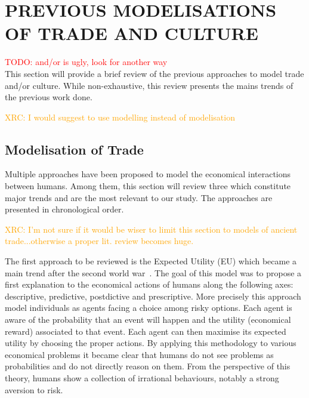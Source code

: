 \documentclass{wscpaperproc}
\newcommand{\memo}[2]{\textcolor{#1}{#2}}
\newcommand{\todo}[1]{\memo{red}{TODO: #1\\}}
\newcommand{\xrc}[1]{\memo{orange}{XRC: #1\\}}
\begin{document}
\section{PREVIOUS MODELISATIONS OF TRADE AND CULTURE}

\todo{and/or is ugly, look for another way}
This section will provide a brief review of the previous approaches to model trade and/or culture. While non-exhaustive, this review presents the mains trends of the previous work done.

\xrc{I would suggest to use modelling instead of modelisation}
\subsection{Modelisation of Trade}

Multiple approaches have been proposed to model the economical interactions between humans. Among them, this section will review three which constitute major trends and are the most relevant to our study. The approaches are presented in chronological order.

\xrc{I'm not sure if it would be wiser to limit this section to models of ancient trade...otherwise a proper lit. review becomes huge.}

The first approach to be reviewed is the Expected Utility (EU) which became a main trend after the second world war~\cite{schoemaker_expected_1982}. The goal of this model was to propose a first explanation to the economical actions of humans along the following axes: descriptive, predictive, postdictive and prescriptive. More precisely this approach model individuals as agents facing a choice among risky options. Each agent is aware of the probability that an event will happen and the utility (economical reward) associated to that event. Each agent can then maximise its expected utility by choosing the proper actions. By applying this methodology to various economical problems it became clear that humans do not see problems as probabilities and do not directly reason on them. From the perspective of this theory, humans show a collection of irrational behaviours, notably a strong aversion to risk.
\end{document}

